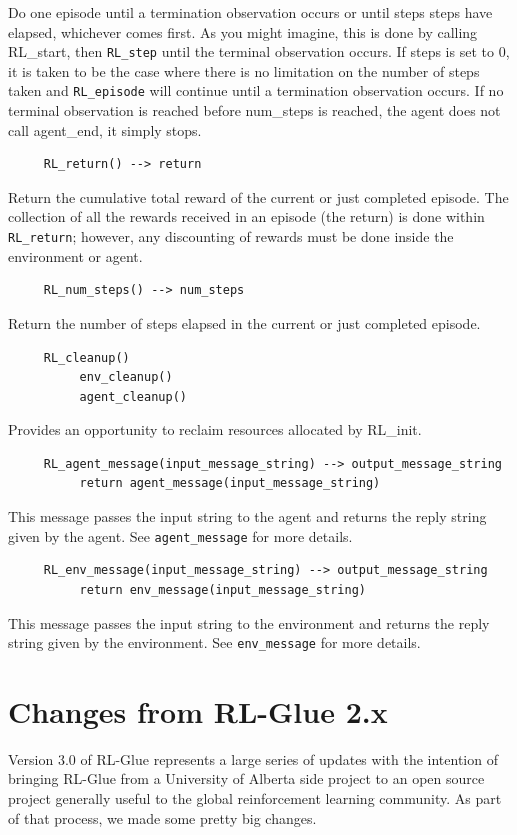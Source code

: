 \documentclass[11pt]{article}
\begin{document}
Do one episode until a termination observation occurs or until steps steps have elapsed, whichever comes first.  As you might imagine, this is done by calling RL\_start, then \texttt{RL\_step} until the terminal observation occurs.  If steps is set to 0, it is taken to be the case where there is no limitation on the number of steps taken and \texttt{RL\_episode} will continue until a termination observation occurs. If no terminal observation is reached before num\_steps is reached, the agent does not call agent\_end, it simply stops.
\begin{verbatim}
     RL_return() --> return
\end{verbatim}
Return the cumulative total reward of the current or just completed episode.  The collection of all the rewards received in an episode (the return) is done within \texttt{RL\_return}; however, any discounting of rewards must be done inside the environment or agent.
\begin{verbatim}
     RL_num_steps() --> num_steps
\end{verbatim}
Return the number of steps elapsed in the current or just completed episode.
\begin{verbatim}
     RL_cleanup()
          env_cleanup()
          agent_cleanup()
\end{verbatim}
Provides an opportunity to reclaim resources allocated by RL\_init.

\begin{verbatim}
     RL_agent_message(input_message_string) --> output_message_string
          return agent_message(input_message_string)
\end{verbatim}
This message passes the input string to the agent and returns the reply string given by the agent. See \texttt{agent\_message} for more details.                
\begin{verbatim}
     RL_env_message(input_message_string) --> output_message_string
          return env_message(input_message_string)
\end{verbatim}
This message passes the input string to the environment and returns the reply string given by the environment. See \texttt{env\_message} for more details. 

\section{Changes from RL-Glue 2.x}
\label{change}
Version 3.0 of RL-Glue represents a large series of updates with the intention of bringing RL-Glue from a University of Alberta side project to an open source project generally useful to the global
reinforcement learning community.  As part of that process, we made some pretty big changes.
\end{document}
